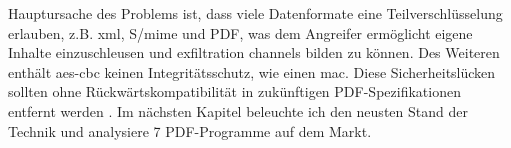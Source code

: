 Hauptursache des Problems ist, dass viele Datenformate eine Teilverschlüsselung erlauben, z.B. \gls{xml}, S/\gls{mime} und PDF, was dem Angreifer ermöglicht eigene Inhalte einzuschleusen und exfiltration channels bilden zu können. Des Weiteren enthält \gls{aes}-\gls{cbc} keinen Integritätsschutz, wie einen \gls{mac}. Diese Sicherheitslücken sollten ohne Rückwärtskompatibilität in zukünftigen PDF-Spezifikationen entfernt werden \cite{pdfex}. Im nächsten Kapitel beleuchte ich den neusten Stand der Technik und analysiere 7 PDF-Programme auf dem Markt.